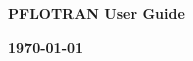 \begin{center}

\longline

{\bf\huge PFLOTRAN User Guide}

\vspace{5cm}

{\bf\LARGE\today}

\end{center}

\longline

